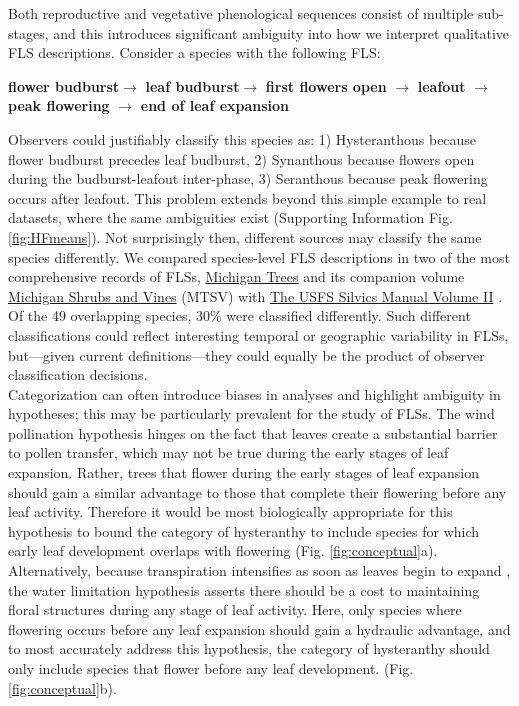 \documentclass[11pt]{article}
\begin{document}
\noindent Both reproductive and vegetative phenological sequences consist of multiple sub-stages, and this introduces significant ambiguity into how we interpret qualitative FLS descriptions. Consider a species with the following FLS:\\

\begin{center}
\textbf{flower budburst}$\rightarrow$ \textbf{leaf budburst}$\rightarrow$ \textbf{first flowers open} $\rightarrow$ \textbf{leafout} $\rightarrow$ \textbf{peak flowering} $\rightarrow$ \textbf{end of leaf expansion} \\
\end{center}

\noindent Observers could justifiably classify this species as: 1) Hysteranthous because flower budburst precedes leaf budburst, 2) Synanthous because flowers open during the budburst-leafout inter-phase, 3) Seranthous because peak flowering occurs after leafout. This problem extends beyond this simple example to real datasets, \citep[e.g.][]{OKeefe2015} where the same ambiguities exist (Supporting Information Fig. \ref{fig:HFmeans}). Not surprisingly then, different sources may classify the same species differently. We compared species-level FLS descriptions in two of the most comprehensive records of FLSs, \underline{Michigan Trees} and its companion volume \underline{Michigan Shrubs and Vines} (MTSV) \citep{Barnes2004,Barnes2016} with \underline{The USFS Silvics Manual Volume II} \citep{Burns1990}. Of the 49 overlapping species, 30\% were classified differently. Such different classifications could reflect interesting temporal or geographic variability in FLSs, but---given current definitions---they could equally be the product of observer classification decisions.\\

\noindent Categorization can often introduce biases in analyses \citep{Edwards2015} and highlight ambiguity in hypotheses; this may be particularly prevalent for the study of FLSs. The wind pollination hypothesis hinges on the fact that leaves create a substantial barrier to pollen transfer, which may not be true during the early stages of leaf expansion. Rather, trees that flower during the early stages of leaf expansion should gain a similar advantage to those that complete their flowering before any leaf activity. Therefore it would be most biologically appropriate for this hypothesis to bound the category of hysteranthy to include species for which early leaf development overlaps with flowering (Fig. \ref{fig:conceptual}a). Alternatively, because transpiration intensifies as soon as leaves begin to expand \citep{Wang2018}, the water limitation hypothesis asserts there should be a cost to maintaining floral structures during any stage of leaf activity. Here, only species where flowering occurs before any leaf expansion should gain a hydraulic advantage, and to most accurately address this hypothesis, the category of hysteranthy should only include species that flower before any leaf development. (Fig. \ref{fig:conceptual}b).\\ 
\end{document}
